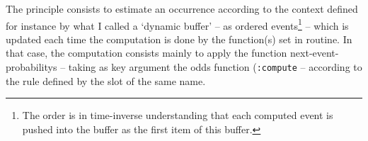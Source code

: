 The principle consists to estimate an occurrence according to the context defined for instance by what I called a `dynamic buffer' -- as ordered events\footnote{The order is in time-inverse understanding that each computed event is pushed into the buffer as the first item of this buffer.} -- which is updated each time the computation is done by the function(s) set in routine. 
In that case, the computation consists mainly to apply the function \glspl{next-event-probability} -- taking as key argument %
the odds function (\texttt{:compute} %
--  according to the rule defined by the slot of the same name.  %

\bigskip

